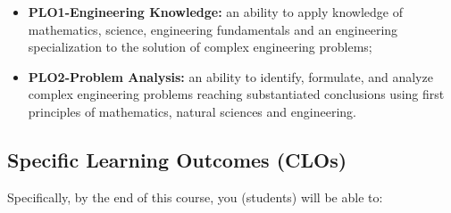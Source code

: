 \documentclass[a4paper,11pt]{article}
\begin{document}
\begin{itemize}
	\item \textbf{PLO1-Engineering Knowledge:} an ability to apply knowledge of mathematics, science, engineering fundamentals and an engineering specialization to the solution of complex engineering problems;
	\item \textbf{PLO2-Problem Analysis:} an ability to identify, formulate, and analyze complex engineering problems reaching substantiated conclusions using first principles of mathematics, natural sciences and engineering.
\end{itemize}


\subsection{Specific Learning Outcomes (CLOs)}
Specifically, by the end of this course, you (students) will be able to:
\end{document}
